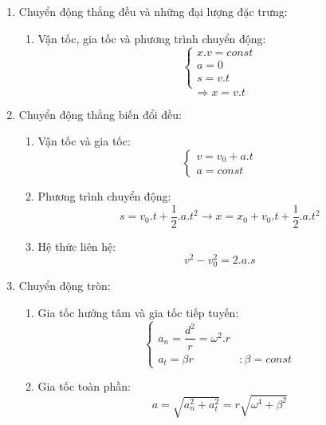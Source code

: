 \documentclass[12pt,a4paper]{report}
\begin{document}
{\begin{center}
    
    \begin{enumerate}
        \item Chuyển động thẳng đều và những đại lượng đặc trưng:
            \begin{enumerate}
                \item Vận tốc, gia tốc và phương trình chuyển động:
                    \[\left\{
                    \begin{array}{lr}
                    x.v = const \\
                    a = 0  \\
                    s = v.t \\
                    \end{array}
                    \right.
                    \]
                    \[\Rightarrow x = v.t\]
            \end{enumerate}
        \item Chuyển động thẳng biến đổi đều:
            \begin{enumerate}
                \item Vận tốc và gia tốc: \[
                    \left\{
                    \begin{array}{lr}
                    v = v_{0} + a.t \\
                    a = const
                    \end{array}
                    \right.
                \]
                \item Phương trình chuyển động: \[
                    s = v_{0}.t + \dfrac{1}{2}.a.t^{2}  \rightarrow  x = x_{0} + v_{0}.t + \dfrac{1}{2}.a.t^{2}
                \]
                \item Hệ thức liên hệ: \[
                    v^{2} - v_{0}^{2} = 2.a.s  
                \]
            \end{enumerate}
        \item  Chuyển động tròn:
            \begin{enumerate}
                \item Gia tốc hướng tâm và gia tốc tiếp tuyến:\[
                    \left\{
                    \begin{array}{lr}
                        a_{n} = \dfrac{d^{2}}{r} = \omega ^{2}.r \\
                        a_{t} = \beta r & :  \beta = const
                    \end{array}
                    \right.  
                \]
                \item Gia tốc toàn phần: \[a = \sqrt{a_{n}^{2} + a_{t}^{2}} = r\sqrt{\omega ^{4} + \beta ^{2}}\]

\end{enumerate}
\end{enumerate}
\end{center}}
\end{document}
